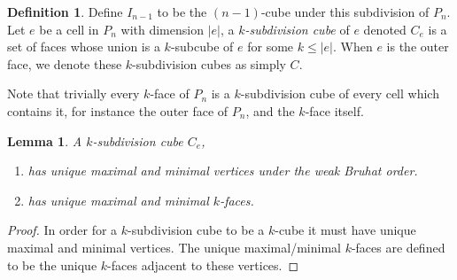 \documentclass{amsart}
\newtheorem{lemma}[theorem]{Lemma}
\theoremstyle{definition}
\newtheorem{definition}[theorem]{Definition}
\newcommand{\subdivcubeofe}{C_e}
\newcommand{\subdivcubeofouter}{C}
\begin{document}
\begin{definition} \label{def:Subdivisions}
Define $I_{n-1}$ to be the $(n-1)$-cube under this subdivision of $P_{n}$. 
Let $e$ be a cell in $P_{n}$ with dimension $|e|$,  a \emph{$k$-subdivision cube} of $e$ denoted $\subdivcubeofe$ is a set of faces whose union is a $k$-subcube of $e$ for some $k\leq |e|$.
When $e$ is the outer face, we denote these $k$-subdivision cubes as simply $\subdivcubeofouter$.
\end{definition}
Note that trivially every $k$-face of $P_n$ is a $k$-subdivision cube of every cell which contains it, for instance the outer face of $P_n$, and the $k$-face itself. 

\begin{lemma}\label{lem:k-subdiv cubes have max/min k faces}
A $k$-subdivision cube $\subdivcubeofe$,
\begin{enumerate}
    \item has unique maximal and minimal vertices under the weak Bruhat order.
    \item has unique maximal and minimal $k$-faces.
\end{enumerate}
\end{lemma}

\begin{proof}
In order for a $k$-subdivision cube to be a $k$-cube it must have unique maximal and minimal vertices.
The unique maximal/minimal $k$-faces are defined to be the unique $k$-faces adjacent to these vertices.
\end{proof}
\end{document}
